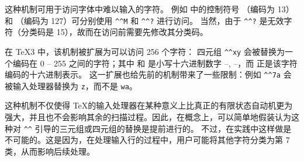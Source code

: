 \documentclass{book}
\begin{document}
这种机制可用于访问字体中难以输入的字符。
例如 \ascii 中的控制符号 （\ascii 编码为 13）和 （\ascii 编码为 127）可分别使用 \verb>^^M> 和 \verb>^^?> 进行访问。
当然，由于 \verb>^^?> 是无效字符（分类码是 15），故而在访问前需要先修改其分类码。

在 \TeX3 中，该机制被扩展为可以访问 256 个字符：
四元组 \verb-^^xy- 会被替换为一个编码在 0 -- 255 之间的字符；其中  和  是小写十六进制数字 --, --，而  正是该字符编码的十六进制表示。
这一扩展也给先前的机制带来了一些限制：例如 \verb>^^7a> 会被输入处理器替换为 \verb>z>，而不是 \verb>wa>。

这种机制不仅使得 \TeX 的输入处理器在某种意义上比真正的有限状态自动机更为强大，并且也不会影响其余的扫描过程。因此，在概念上，可以简单地假装认为这种对 \verb>^^> 引导的三元组或四元组的替换是提前进行的。
不过，在实践中这样做是不可能的。这是因为，在处理输入行的过程中，用户可能将其他字符分类为第 7 类，从而影响后续处理。
\end{document}
